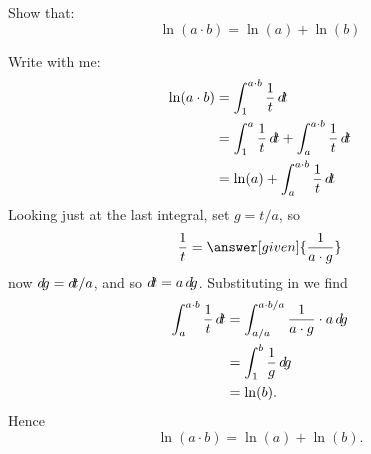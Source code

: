 \documentclass{ximera}
\begin{document}
\begin{example}
  Show that:
  \[
  \ln(a\cdot b) = \ln(a) + \ln(b)
  \]
  \begin{explanation}
    Write with me:
    \begin{align*}
      \ln(a\cdot b) &= \int_1^{a\cdot b} \frac{1}{t}\d t\\
      &= \int_1^{a} \frac{1}{t}\d t + \int_a^{a\cdot b} \frac{1}{t}\d t\\
      &= \ln(a) + \int_a^{a\cdot b} \frac{1}{t}\d t
    \end{align*}
    Looking just at the last integral, set $g= t/a$, so
    \[
    \frac{1}{t} = \answer[given]{\frac{1}{a\cdot g}}
    \]
    now $\mathop{}\!d\! g = \mathop{}\!d\! t/a$, and so $\mathop{}\!d\! t= a \mathop{}\!d\! g$. Substituting in we find
    \begin{align*}
      \int_a^{a\cdot b} \frac{1}{t}\mathop{}\!d\! t &= \int_{a/a}^{a\cdot b/a} \frac{1}{a \cdot g} \cdot a \mathop{}\!d\! g\\
      &= \int_{1}^{b} \frac{1}{g}\mathop{}\!d\! g\\
      &= \ln(b).
    \end{align*}
    Hence
    \[
    \ln(a\cdot b) = \ln(a) + \ln(b).
    \]
  \end{explanation}
\end{example}
\end{document}
